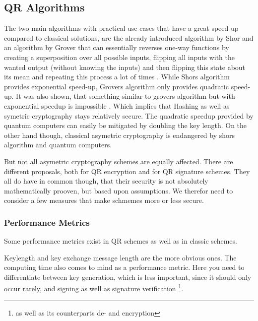 \documentclass[conference]{IEEEtran}
\newcommand{\comment}[1]{}
\begin{document}
\subsection{QR Algorithms}\label{l:qr-algs}
The two main algorithms with practical use cases that have a great speed-up compared to classical solutions, are the already introduced algorithm by Shor and an algorithm by Grover that can essentially reverses one-way functions by creating a superposition over all possible inputs, flipping all inputs with the wanted output (without knowing the inputs) and then flipping this state about its mean and repeating this process a lot of times \cite{Grover}.
While Shors algorithm provides exponential speed-up, Grovers algorithm only provides quadratic speed-up. It was also shown, that something similar to grovers algorithm but with exponential speedup is impossible \cite{Strengths&Weaknesses_QC}. 
Which implies that Hashing as well as symetric cryptography stays relatively secure.
The quadratic speedup provided by quantum computers can easily be mitigated by doubling the key length.
On the other hand though, classical asymetric cryptography is endangered by shors algorithm and quantum computers.

But not all asymetric cryptography schemes are equally affected.
There are different proposals, both for QR encryption and for QR signature schemes.
They all do have in common though, that their security is not absolutely mathematically prooven, but based upon assumptions.
We therefor need to consider a few measures that make schmemes more or less secure.
\subsubsection{Performance Metrics}
\comment{ %
    - Security Level (1-5, AES-128, SHA256, AES-192, SHA384, AES-256) \cite{QR_Iot_Lattice,Energy_comp}([7]) determined via grovers alg
    - no standard benchmark for quantum resistance \cite{QR_comparison} (nist levels 1-5)
} %

Some performance metrics exist in QR schemes as well as in classic schemes.

Keylength and key exchange message length \cite{QR_algs} are the more obvious ones.
The computing time also comes to mind as a performance metric. Here you need to differentiate between key generation, which is less important, since it should only occur rarely, and signing as well as signature verification \footnote{as well as its counterparts de- and encryption}.
\end{document}
